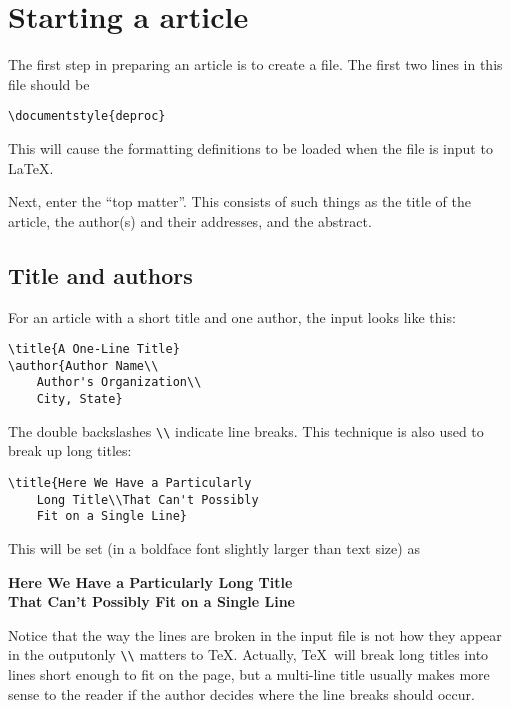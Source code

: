 \section{Starting a \DProc\/ article}

The first step in preparing an article is to create a file.
The first two lines in this file should be
\begin{verbatim}
\documentstyle{deproc}

\end{verbatim}
This will cause the formatting definitions to be loaded when the file
is input to \LaTeX.

Next, enter the ``top matter''.  This consists of such
things as the title of the article, the author(s) and their addresses,
and the abstract.

\subsection{Title and authors}

For an article with a short title and one author, the input looks like this:
\begin{verbatim}
\title{A One-Line Title}
\author{Author Name\\
    Author's Organization\\
    City, State}
\end{verbatim}
The double backslashes \verb"\\" indicate line breaks.  This technique is
also used to break up long titles:
\begin{verbatim}
\title{Here We Have a Particularly
    Long Title\\That Can't Possibly
    Fit on a Single Line}
\end{verbatim}
This will be set (in a boldface font slightly larger than text size) as\strut
\begin{center}
        \bf Here We Have a Particularly Long Title\\
        That Can't Possibly Fit on a Single Line
\end{center}
Notice that the way the lines are broken in the input file is not how
they appear in the output\Dash only \verb"\\" matters to \TeX.
Actually, \TeX\ will break long titles into lines short enough to fit
on the page, but a multi-line title usually makes more sense to the reader
if the author decides where the line breaks should occur.

